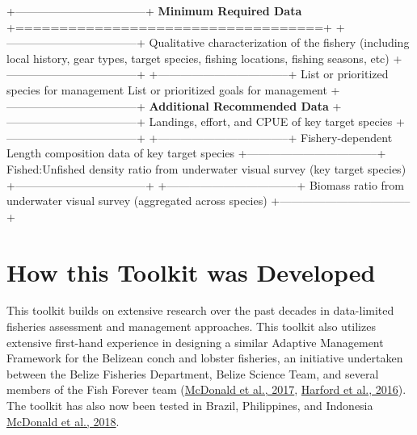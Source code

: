 \documentclass[]{book}
\begin{document}
+-----------------------------------+ \textbar{} \textbf{Minimum
Required Data} \textbar{} +===================================+
\textbar{} \textbar{} +-----------------------------------+ \textbar{}
Qualitative characterization of \textbar{} \textbar{} the fishery
(including local \textbar{} \textbar{} history, gear types, target
\textbar{} \textbar{} species, fishing locations, \textbar{} \textbar{}
fishing seasons, etc) \textbar{} +-----------------------------------+
+-----------------------------------+ \textbar{} List or prioritized
species for \textbar{} \textbar{} management \textbar{} \textbar{}
\textbar{} \textbar{} List or prioritized goals for \textbar{}
\textbar{} management \textbar{} +-----------------------------------+
\textbar{}\textbf{Additional Recommended Data} \textbar{}
+-----------------------------------+ \textbar{} Landings, effort, and
CPUE of key \textbar{} \textbar{} target species \textbar{}
+-----------------------------------+
+-----------------------------------+ \textbar{} Fishery-dependent
\textbar{} \textbar{} Length composition data of key \textbar{}
\textbar{} target species \textbar{}
+-----------------------------------+ \textbar{} Fished:Unfished density
ratio \textbar{} \textbar{} from underwater visual survey \textbar{}
\textbar{} (key target species) \textbar{}
+-----------------------------------+
+-----------------------------------+ \textbar{} Biomass ratio
\textbar{} \textbar{} from underwater visual survey \textbar{}
\textbar{} (aggregated across species) \textbar{}
+-----------------------------------+

\section{How this Toolkit was
Developed}\label{how-this-toolkit-was-developed}

This toolkit builds on extensive research over the past decades in
data-limited fisheries assessment and management approaches. This
toolkit also utilizes extensive first-hand experience in designing a
similar Adaptive Management Framework for the Belizean conch and lobster
fisheries, an initiative undertaken between the Belize Fisheries
Department, Belize Science Team, and several members of the Fish Forever
team (\href{http://dx.doi.org/10.1016/j.marpol.2016.11.027}{McDonald et
al., 2017}, \href{http://dx.doi.org/10.5343/bms.2016.1025}{Harford et
al., 2016}). The toolkit has also now been tested in Brazil,
Philippines, and Indonesia
\href{https://doi.org/10.1016/j.ocecoaman.2017.11.015}{McDonald et al.,
2018}.
\end{document}
